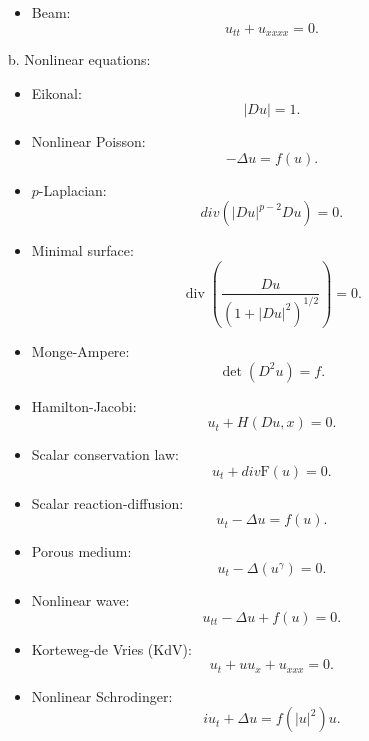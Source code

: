 \begin{example}
\begin{itemize}
    \item Beam:
    \[
        u_{tt} + u_{xxxx} = 0.    
    \]
\end{itemize}
\noindent b. Nonlinear equations:
\begin{itemize}
    \item Eikonal:
    \[
        |Du| = 1.    
    \]
    \item Nonlinear Poisson:
    \[
        -\Delta u = f(u).
    \]
    \item $p$-Laplacian:
    \[
        div(|Du|^{p-2}Du) = 0.     
    \]
    \item Minimal surface:
    \[
        \operatorname{div}\left(\frac{D u}{\left(1+|D u|^{2}\right)^{1 / 2}}\right)=0.
    \]
    \item Monge-Ampere:
    \[
        \det(D^2u)=f.    
    \]
    \item Hamilton-Jacobi:
    \[
        u_t + H(Du, x) =0.  
    \]
    \item Scalar conservation law:
    \[
        u_t + div \mathrm{F}(u)=0.   
    \]
    \item Scalar reaction-diffusion:
    \[
        u_t - \Delta u = f(u).  
    \]
    \item Porous medium:
    \[
        u_t - \Delta(u^\gamma) =0.  
    \]
    \item Nonlinear wave: 
    \[ 
        u_{tt} - \Delta u + f(u) = 0.
    \]
    \item Korteweg-de Vries (KdV):
    \[
        u_t + uu_x + u_{xxx} = 0.  
    \]
    \item Nonlinear Schrodinger:
    \[
        iu_t + \Delta u = f(|u|^2)u.  
    \]
\end{itemize} 
\end{example}

